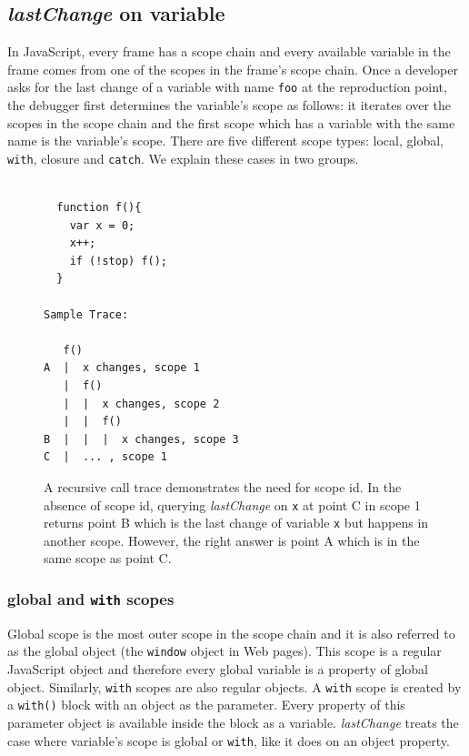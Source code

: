 \documentclass[runningheads,a4paper]{llncs}
\begin{document}
\subsection{\textit{lastChange} on variable} 
In JavaScript, every frame has a scope chain and every available
variable in the frame comes from one of the scopes in the frame's
scope chain. Once a developer asks for the last change of a variable with name 
\texttt{foo} at the reproduction point, the debugger first determines the
variable's scope as follows: it iterates over the scopes in the scope
chain and the first scope which has a variable with the same name is
the variable's scope. There are five different scope types: local,
global, \texttt{with}, closure and \texttt{catch}. We explain these
cases in two groups.

\begin{figure}[htp]
\begin{verbatim}

  function f(){
    var x = 0;
    x++;
    if (!stop) f();
  }

Sample Trace:

   f()
A  |  x changes, scope 1 
   |  f()
   |  |  x changes, scope 2
   |  |  f()
B  |  |  |  x changes, scope 3 
C  |  ... , scope 1

\end{verbatim}
\caption{A recursive call trace demonstrates the need for scope
  id. In the absence of scope id, querying \textit{lastChange} on \texttt{x}
  at point C in scope 1 returns point B which is the last change of variable 
  \texttt{x} but happens in another scope. However, the right answer is point A
  which is in the same scope as point C.}
\label{fig:recursive}
\end{figure}

\subsubsection{global and \texttt{with} scopes}
Global scope is the most outer scope in the scope chain and it is
also referred to as the global object (the \texttt{window}
object in Web pages). This scope is a regular JavaScript object and therefore every
global variable is a property of global object. Similarly,
 \texttt{with} scopes are also regular objects. A \texttt{with}
scope is created by a \texttt{with()} block with an object as the
parameter. Every property of this parameter object is available inside the
block as a variable. \textit{lastChange} treats the case where variable's scope
is global or \texttt{with}, like it does on an object
property.
\end{document}
